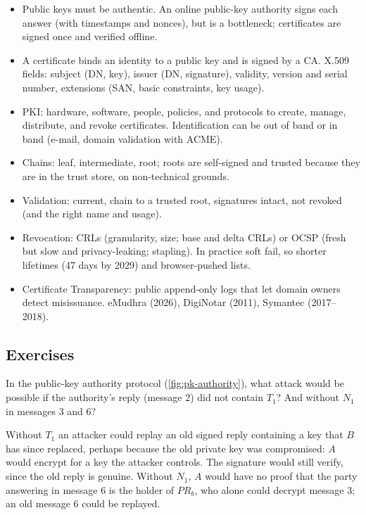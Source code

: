 \begin{summary}
\begin{itemize}
    \item Public keys must be authentic. An online public-key authority signs each answer (with timestamps and nonces), but is a bottleneck; certificates are signed once and verified offline.
    \item A certificate binds an identity to a public key and is signed by a CA. X.509 fields: subject (DN, key), issuer (DN, signature), validity, version and serial number, extensions (SAN, basic constraints, key usage).
    \item PKI: hardware, software, people, policies, and protocols to create, manage, distribute, and revoke certificates. Identification can be out of band or in band (e-mail, domain validation with ACME).
    \item Chains: leaf, intermediate, root; roots are self-signed and trusted because they are in the trust store, on non-technical grounds.
    \item Validation: current, chain to a trusted root, signatures intact, not revoked (and the right name and usage).
    \item Revocation: CRLs (granularity, size; base and delta CRLs) or OCSP (fresh but slow and privacy-leaking; stapling). In practice soft fail, so shorter lifetimes (47 days by 2029) and browser-pushed lists.
    \item Certificate Transparency: public append-only logs that let domain owners detect misissuance. eMudhra (2026), DigiNotar (2011), Symantec (2017--2018).
\end{itemize}
\end{summary}

\subsection*{Exercises}

\begin{exercise}
In the public-key authority protocol (\cref{fig:pk-authority}), what attack would be possible if the authority's reply (message 2) did not contain $T_1$? And without $N_1$ in messages 3 and 6?
\end{exercise}
\begin{solution}
Without $T_1$ an attacker could replay an old signed reply containing a key that $B$ has since replaced, perhaps because the old private key was compromised: $A$ would encrypt for a key the attacker controls. The signature would still verify, since the old reply is genuine. Without $N_1$, $A$ would have no proof that the party answering in message 6 is the holder of $PR_b$, who alone could decrypt message 3; an old message 6 could be replayed.
\end{solution}

